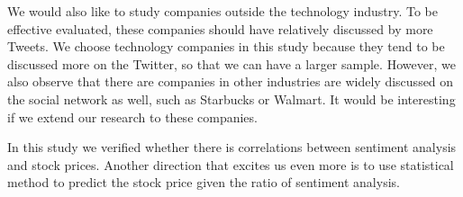 \documentclass[12pt]{article}
\begin{document}
We would also like to study companies outside the technology industry. To be effective evaluated, these companies should have relatively discussed by more Tweets. We choose technology companies in this study because they tend to be discussed more on the Twitter, so that we can have a larger sample. However, we also observe that there are companies in other industries are widely discussed on the social network as well, such as Starbucks or Walmart. It would be interesting if we extend our research to these companies.

In this study we verified whether there is correlations between sentiment analysis and stock prices. Another direction that excites us even more is to use statistical method to predict the stock price given the ratio of sentiment analysis.



\end{document}
